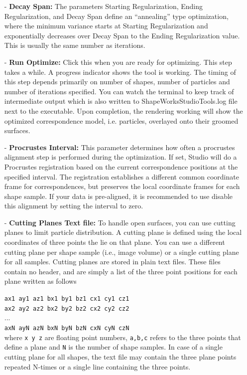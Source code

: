 \documentclass[letterpaper,12pt]{article}   %
\begin{document}
\begin{itemize}

\item[-] \textbf{Decay Span:} The parameters Starting Regularization, Ending Regularization, and Decay Span define an “annealing” type optimization, where the minimum variance starts at Starting Regularization and exponentially decreases over Decay Span to the
Ending Regularization value. This is usually the same number as iterations.

\item[-] \textbf{Run Optimize:} Click this when you are ready for optimizing. This step takes a while. A progress indicator shows the tool is working. The timing of this step depends primarily on number of shapes, number of particles and number of iterations specified. You can watch the terminal to keep track of intermediate output which is also written to ShapeWorksStudioTools.log file next to the executable. Upon completion, the rendering working will show the optimized correspondence model, i.e. particles, overlayed onto their groomed surfaces.

\item[-] \textbf{Procrustes Interval:} This parameter determines how often a procrustes alignment step is performed during the optimization. If set, Studio will do a Procrustes registration based on the current correspondence positions at the specified interval. The registration establishes a different common coordinate frame for correspondences, but preserves the local coordinate frames for each shape sample. If your data is pre-aligned, it is recommended to use disable this alignment by setting the interval to zero.

\item[-] \textbf{Cutting Planes Text file:} To handle open surfaces, you can use cutting planes to limit particle distribution. A cutting plane is defined  using the local coordinates of three points the lie on that plane. You can use a different cutting plane per shape sample (i.e., image volume) or a single cutting plane for all samples. Cutting planes are stored in plain text files. These files contain no header, and are simply a list of the three point positions for each plane written as follows 

 \noindent\texttt{ax1 ay1 az1 bx1 by1 bz1 cx1 cy1 cz1}\\
 \noindent\texttt{ax2 ay2 az2 bx2 by2 bz2 cx2 cy2 cz2}\\
 ... \\
 \noindent\texttt{axN ayN azN bxN byN bzN cxN cyN czN}\\
 \noindent where \texttt{x y z} are floating point numbers, \texttt{a,b,c} refers to the three points that define a plane and \texttt{N} is the number of shape samples. In case of a single cutting plane for all shapes, the text file may contain the three plane points repeated N-times or a single line containing the three points. 

\end{itemize}
\end{document}
